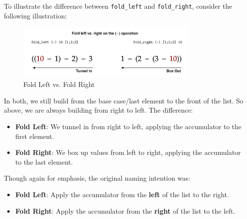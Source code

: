 \newpage 

\noindent
To illustrate the difference between \texttt{fold\_left} and \texttt{fold\_right}, consider the following illustration:

\begin{figure}[h]
    \centering
    \includegraphics[width=0.8\textwidth]{Sections/order/fold.png}
    \caption{Fold Left vs. Fold Right}
\end{figure}

\noindent
In both, we still build from the base case/last element to the front of the list. So above, we are always building from right to left.
The difference: 

\begin{itemize}
    \item \textbf{Fold Left}: We tunnel in from right to left, applying the accumulator to the first element.
    \item \textbf{Fold Right}: We box up values from left to right, applying the accumulator to the last element.
\end{itemize}

\noindent
Though again for emphasis, the original naming intention was: 
\begin{itemize}
    \item \textbf{Fold Left}: Apply the accumulator from the \textbf{left} of the list to the right.
    \item \textbf{Fold Right}: Apply the accumulator from the \textbf{right} of the list to the left.
\end{itemize}




